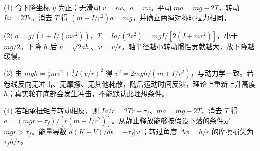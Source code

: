 (1) 令下降坐标 \(y\) 为正；无滑动 \(v=r\omega\)、\(a=r\dot\omega\)。平动 \(ma=mg-2T\)，转动 \(I\dot\omega=2Tr\)。消去 \(T\) 得 \((m+I/r^2)a=mg\)，并确立两绳对称时拉力相同。

(2) \(a=g/(1+I/(mr^2))\)，\(T=I a/(2r^2)=mgI/[2(I+mr^2)]\)，小于 \(mg/2\)。下降 \(h\) 后 \(v=\sqrt{2ah}\)、\(\omega=v/r\)。轴半径越小转动惯性贡献越大，故下降越缓慢。

(3) 由 \(mgh=\frac12mv^2+\frac12I(v/r)^2\) 得 \(v^2=2mgh/(m+I/r^2)\)，与动力学一致。若卷线反向无冲击、无摩擦、无其他耗散，随后运动时间反演，理论上重新上升高度 \(h\)；真实轮在底部会发生冲击，不能默认此理想条件。

(4) 若轴承扭矩与转动相反，则 \(I a/r=2Tr-\tau_f\)、\(ma=mg-2T\)，消去 \(T\) 得 \(a=(mgr-\tau_f)/[r(m+I/r^2)]\)。从静止释放能够按假设下落的条件是 \(mgr>\tau_f\)。能量导数 \(d(K+V)/dt=-\tau_f|\omega|\)；转过角度 \(\Delta\phi=h/r\) 的摩擦损失为 \(\tau_f h/r\)。
